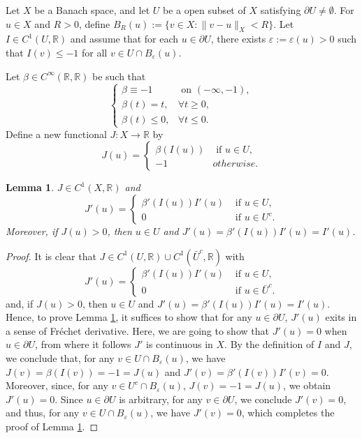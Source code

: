 \documentclass[11pt]{amsart}
\newtheorem{lemma}[theorem]{Lemma}
\newcommand{\norm}[1]{\lVert#1\rVert}
\newcommand{\R}{\mathbb{R}}
\numberwithin{equation}{section}
\begin{document}
    Let $X$ be a Banach space, and let $U$ be a open subset of $X$ satisfying $\partial U \neq \emptyset $. For $u \in X$ and $R>0$, define $B_R(u):=\{v \in X: \norm{v-u}_X<R\}$. Let $I \in C^1(U,\R)$ and assume that for each $u \in \partial U$, there exists $\varepsilon:=\varepsilon(u)>0$ such that  $I(v)\leq -1$  for all $v \in U\cap B_\varepsilon(u)$.

    Let $\beta \in C^\infty(\mathbb{R},\mathbb{R})$ be such that
$$
\begin{cases}
    \beta \equiv -1 &\text{ on } (-\infty,-1),\\
    \beta (t)=t, &\forall t\geq 0,\\
    \beta (t)\leq 0,  &\forall t\leq  0.
\end{cases}
$$
Define a new functional $J: X \to \mathbb{R}$ by
$$J(u) =
\begin{cases}
    \beta(I(u)) &\text{ if } u \in U,\\
    -1  &otherwise.
\end{cases}
$$
\begin{lemma}\label{lemc1}
    $J \in C^1(X,\R)$ and
    $$J'(u) =
\begin{cases}
    \beta'(I(u))I'(u) &\text{ if } u \in U,\\
    0  &\text{ if } u \in U^c.
    \end{cases}
$$
Moreover, if $J(u)>0$, then $u \in U$ and $J'(u) =\beta'(I(u))I'(u)=I'(u)$.
\end{lemma}
\begin{proof}
    It is clear that $J \in C^1(U,\R)\cup C^1(\bar{U}^c,\R)$ with
$$
J'(u) =
\begin{cases}
    \beta'(I(u))I'(u) &\text{ if } u \in U,\\
    0  &\text{ if } u \in \bar{U}^c.
    \end{cases}
$$
and, if $J(u)>0$, then $u \in U$ and $J'(u) =\beta'(I(u))I'(u)=I'(u)$.
Hence, to prove Lemma \ref{lemc1}, it suffices to show that for any $u \in \partial U$, $J'(u)$ exits in a sense of Fr\'echet derivative. Here, we are going to show that  $J'(u)=0$ when  $u \in \partial U$, from where it follows $J'$ is continuous in $X$. By the definition of $I$ and $J$, we conclude that, for any $v \in U\cap B_\varepsilon(u)$, we have $J(v)=\beta(I(v))=-1=J(u)$ and $J'(v)=\beta'(I(v))I'(v)=0$. Moreover, since, for any $v \in U^c\cap B_\varepsilon(u)$, $J(v)=-1=J(u)$, we obtain $J'(u)=0$. Since $u \in \partial U$ is arbitrary, for any $v \in \partial U$, we conclude $J'(v)=0$, and thus, for any $v \in  U\cap B_\varepsilon(u)$, we have $J'(v)=0$, which completes the proof of Lemma \ref{lemc1}.
\end{proof}
\end{document}
